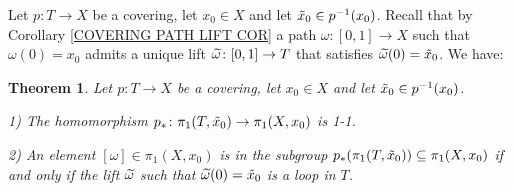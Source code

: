 \documentclass[11pt, letterpaper, oneside]{report}
\theoremstyle{pplain}
\newtheorem{theorem}{Theorem}[chapter]
\theoremstyle{ddefinition}
\theoremstyle{nnn}
\theoremstyle{eexercise}
\newcommand{\ntilde}{\skew{3}\tilde}
\newcommand{\nwidetilde}{\skew{4}\widetilde}
\begin{document}
Let $p\colon T\to X$ be a covering, let $x_{0}\in X$ and let $\ntilde{x}_{0}\in p^{-1}(x_{0})$. Recall
that by Corollary \ref{COVERING PATH LIFT COR}  a path $\omega\colon [0, 1]\to X$ such that 
$\omega(0) = x_{0}$ admits a unique lift $\nwidetilde{\omega}\colon [0, 1] \to T$ that satisfies 
$\nwidetilde{\omega}(0) = \ntilde{x}_{0}$. We have:

\begin{theorem}
\label{COVERINGSUBGP THM}
Let $p\colon T\to X$ be a covering, let $x_{0}\in X$ and let $\ntilde{x}_{0}\in p^{-1}(x_{0})$. 

1) The homomorphism $p_{\ast}\colon \pi_{1}(T, \ntilde{x}_{0}) \to \pi_{1}(X, x_{0})$ is 1-1.

2) An element $[\omega]\in \pi_{1}(X, x_{0})$ is in the subgroup 
$p_{\ast}(\pi_{1}(T, \ntilde{x}_{0}))\subseteq \pi_{1}(X, x_{0})$ if and only if the lift $\nwidetilde{\omega}$ such that 
$\nwidetilde{\omega}(0) = \ntilde{x}_{0}$ is a loop in $T$. 
\end{theorem}
\end{document}
